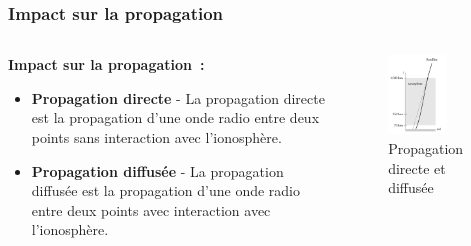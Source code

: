 \documentclass[xcolor=dvipsnames,envcountsect]{beamer}
\begin{document}
\begin{frame}
	\frametitle{Impact sur la propagation}
		\justifying
		\begin{columns}
			\begin{column}{0.5\textwidth}
				\textbf{Impact sur la propagation :} 
				\begin{itemize}
					\item \textbf{Propagation directe} - La propagation directe est la propagation d'une onde radio entre deux points sans interaction avec l'ionosphère.
					\item \textbf{Propagation diffusée} - La propagation diffusée est la propagation d'une onde radio entre deux points avec interaction avec l'ionosphère.
				\end{itemize}
			\end{column}
			\begin{column}{0.5\textwidth}
				\begin{figure}
					\centering
					\includegraphics[width=0.7\textwidth]{./Figures/iono_e3a.png}
					\caption {Propagation directe et diffusée \cite{e3a}}	
				\end{figure}
			\end{column}
	\end{columns}
\end{frame}
\end{document}
